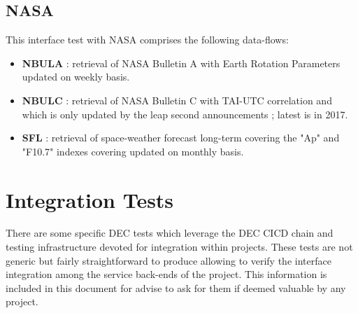 \documentclass[dec_sum_main.tex]{subfiles}
\begin{document}
\subsection{NASA}
This interface test with NASA comprises the following data-flows:
\begin{itemize}
    \item \textbf{NBULA} : retrieval of NASA Bulletin A with Earth Rotation Parameters updated on weekly basis.
    \item \textbf{NBULC} : retrieval of NASA Bulletin C with TAI-UTC correlation and which is only updated by the leap second announcements ; latest is in 2017.
    \item \textbf{SFL} : retrieval of space-weather forecast long-term covering the "Ap" and "F10.7" indexes covering updated on monthly basis.
\end{itemize}


\section{Integration Tests}
There are some specific DEC tests which leverage the DEC CICD chain and testing infrastructure devoted for integration within projects. These tests are not generic but fairly straightforward to produce allowing to verify the interface integration among the service back-ends of the project. This information is included in this document for advise to ask for them if deemed valuable by any project.
\end{document}
